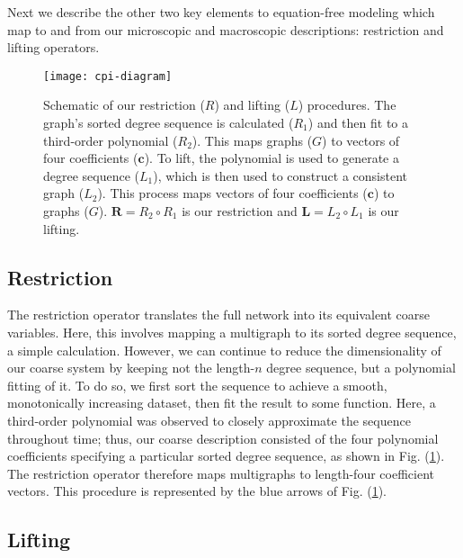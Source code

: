 \documentclass[epjST, final]{svjour}
\begin{document}
\begin{onehalfspace}
Next we describe the other two key elements to equation-free modeling
which map to and from our microscopic and macroscopic descriptions:
restriction and lifting operators.

\begin{figure}[ht!]
  \centering
  \texttt{[image: cpi-diagram]}
  \caption{Schematic of our restriction ($R$) and lifting ($L$)
    procedures. The graph's sorted degree sequence is calculated
    ($R_1$) and then fit to a third-order polynomial ($R_2$). This
    maps graphs ($G$) to vectors of four coefficients
    ($\mathbf{c}$). To lift, the polynomial is used to generate a
    degree sequence ($L_1$), which is then used to construct a
    consistent graph ($L_2$). This process maps vectors of
    four coefficients ($\mathbf{c}$) to graphs
    ($G$). $\mathbf{R} = R_2 \circ R_1 $ is our restriction and $\mathbf{L} = L_2 \circ
    L_1$ is our lifting. \label{fig:cpi-diagram}}
\end{figure}


\subsection{Restriction}

The restriction operator translates the full network into its
equivalent coarse variables. Here, this involves mapping a multigraph
to its sorted degree sequence, a simple calculation. However, we can
continue to reduce the dimensionality of our coarse system by keeping
not the length-$n$ degree sequence, but a polynomial fitting of it. To
do so, we first sort the sequence to achieve a smooth, monotonically
increasing dataset, then fit the result to some function. Here, a
third-order polynomial was observed to closely approximate the
sequence throughout time; thus, our coarse description consisted of
the four polynomial coefficients specifying a particular sorted degree
sequence, as shown in Fig. (\ref{fig:cpi-diagram}). The restriction
operator therefore maps multigraphs to length-four coefficient
vectors. This procedure is represented by the blue arrows of
Fig. (\ref{fig:cpi-diagram}).

\subsection{Lifting}


\end{onehalfspace}
\end{document}

